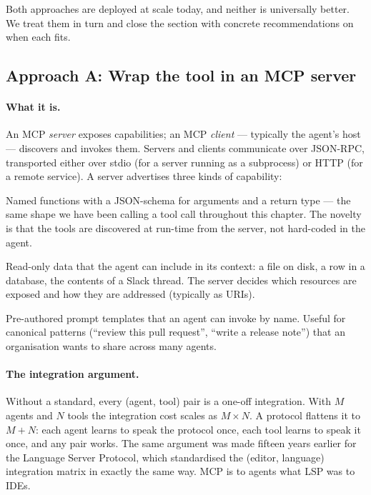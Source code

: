 Both approaches are deployed at scale today, and neither is
universally better. We treat them in turn and close the section
with concrete recommendations on when each fits.

\subsection{Approach A: Wrap the tool in an MCP server}
\label{sec:mcp-approach}

\paragraph{What it is.}
An MCP \emph{server} exposes capabilities; an MCP \emph{client} ---
typically the agent's host --- discovers and invokes them. Servers
and clients communicate over JSON-RPC, transported either over
stdio (for a server running as a subprocess) or HTTP (for a remote
service). A server advertises three kinds of capability:

\begin{description}[style=nextline,leftmargin=1.5em]
\item[Tools.] Named functions with a JSON-schema for arguments and
  a return type --- the same shape we have been calling a tool call
  throughout this chapter. The novelty is that the tools are
  discovered at run-time from the server, not hard-coded in the
  agent.
\item[Resources.] Read-only data that the agent can include in its
  context: a file on disk, a row in a database, the contents of a
  Slack thread. The server decides which resources are exposed and
  how they are addressed (typically as URIs).
\item[Prompts.] Pre-authored prompt templates that an agent can
  invoke by name. Useful for canonical patterns (``review this pull
  request'', ``write a release note'') that an organisation wants
  to share across many agents.
\end{description}

\paragraph{The integration argument.}
Without a standard, every (agent, tool) pair is a one-off
integration. With $M$ agents and $N$ tools the integration cost
scales as $M \times N$. A protocol flattens it to $M + N$: each
agent learns to speak the protocol once, each tool learns to speak
it once, and any pair works. The same argument was made fifteen
years earlier for the Language Server Protocol, which standardised
the (editor, language) integration matrix in exactly the same way.
MCP is to agents what LSP was to IDEs.

